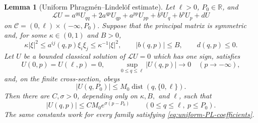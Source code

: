 \documentclass[11pt,reqno]{amsart}
\numberwithin{equation}{section}
\newtheorem{lemma}[theorem]{Lemma}
\theoremstyle{definition}
\theoremstyle{remark}
\begin{document}
\begin{lemma}[Uniform Phragm\'en--Lindel\"of estimate]
\label{lem:uniform-cylinder-PL}
Let $\ell>0$, $P_0\in\mathbb R$, and
\[
 \mathscr LU=a^{qq}U_{qq}+2a^{qp}U_{qp}+a^{pp}U_{pp}
 +b^qU_q+b^pU_p+dU
\]
on $\mathcal C=(0,\ell)\times(-\infty,P_0)$.  Suppose that
the principal matrix is symmetric and, for some $\kappa\in(0,1)$
and $B>0$,
\begin{equation}\label{eq:uniform-PL-coefficients}
 \kappa |\xi|^2\le a^{ij}(q,p)\xi_i\xi_j
 \le\kappa^{-1}|\xi|^2,
 \qquad |b(q,p)|\le B,
 \qquad d(q,p)\le0.
\end{equation}
Let $U$ be a bounded classical solution of $\mathscr LU=0$ which
has one sign, satisfies
\[
 U(0,p)=U(\ell,p)=0,
 \qquad
 \sup_{0\le q\le\ell}|U(q,p)|\longrightarrow0
 \quad(p\to-\infty),
\]
and, on the finite cross-section, obeys
\begin{equation}\label{eq:uniform-PL-cross-section}
 |U(q,P_0)|\le M_0\operatorname{dist}(q,\{0,\ell\}).
\end{equation}
Then there are $C,\sigma>0$, depending only on
$\kappa,B,$ and $\ell$, such that
\begin{equation}\label{eq:uniform-PL-conclusion}
 |U(q,p)|\le CM_0 e^{\sigma(p-P_0)}
 \qquad(0\le q\le\ell,\ p\le P_0).
\end{equation}
The same constants work for every family satisfying
\eqref{eq:uniform-PL-coefficients}.
\end{lemma}
\end{document}
